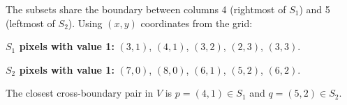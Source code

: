 \documentclass[12pt]{article}
\begin{document}

\begin{stepbox}[Step 1: Identify Pixels in V = \{1\} Near the Boundary]
The subsets share the boundary between columns 4 (rightmost of $S_1$) and 5 (leftmost of $S_2$). Using $(x,y)$ coordinates from the grid:

\textbf{$S_1$ pixels with value 1:} $(3,1)$, $(4,1)$, $(3,2)$, $(2,3)$, $(3,3)$.

\textbf{$S_2$ pixels with value 1:} $(7,0)$, $(8,0)$, $(6,1)$, $(5,2)$, $(6,2)$.
\end{stepbox}

\begin{stepbox}
The closest cross-boundary pair in $V$ is $p = (4,1) \in S_1$ and $q = (5,2) \in S_2$.


\end{stepbox}
\end{document}
